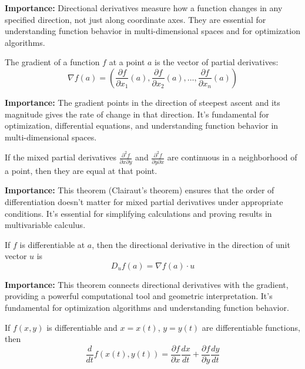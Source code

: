 \noindent\textbf{Importance:} Directional derivatives measure how a function changes in any specified direction, not just along coordinate axes. They are essential for understanding function behavior in multi-dimensional spaces and for optimization algorithms.



\begin{definition}[Gradient]
The gradient of a function $f$ at a point $a$ is the vector of partial derivatives:
\[ \nabla f(a) = \left(\frac{\partial f}{\partial x_1}(a), \frac{\partial f}{\partial x_2}(a), \ldots, \frac{\partial f}{\partial x_n}(a)\right) \]
\end{definition}

\noindent\textbf{Importance:} The gradient points in the direction of steepest ascent and its magnitude gives the rate of change in that direction. It's fundamental for optimization, differential equations, and understanding function behavior in multi-dimensional spaces.



\begin{theorem}
If the mixed partial derivatives $\frac{\partial^2 f}{\partial x \partial y}$ and $\frac{\partial^2 f}{\partial y \partial x}$ are continuous in a neighborhood of a point, then they are equal at that point.
\end{theorem}

\noindent\textbf{Importance:} This theorem (Clairaut's theorem) ensures that the order of differentiation doesn't matter for mixed partial derivatives under appropriate conditions. It's essential for simplifying calculations and proving results in multivariable calculus.



\begin{theorem}
If $f$ is differentiable at $a$, then the directional derivative in the direction of unit vector $u$ is
\[ D_u f(a) = \nabla f(a) \cdot u \]
\end{theorem}

\noindent\textbf{Importance:} This theorem connects directional derivatives with the gradient, providing a powerful computational tool and geometric interpretation. It's fundamental for optimization algorithms and understanding function behavior.



\begin{theorem}
If $f(x,y)$ is differentiable and $x = x(t)$, $y = y(t)$ are differentiable functions, then
\[ \frac{d}{dt}f(x(t), y(t)) = \frac{\partial f}{\partial x}\frac{dx}{dt} + \frac{\partial f}{\partial y}\frac{dy}{dt} \]
\end{theorem}


